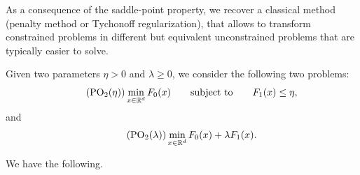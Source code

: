 \documentclass{report}
\begin{document}
As a consequence of the saddle-point property, we recover a classical method (penalty method or Tychonoff regularization), that allows to transform constrained problems in different but equivalent unconstrained problems that are typically easier to solve.

Given two parameters $\eta> 0$ and $\lambda \ge 0$, we consider the following two problems:
	\begin{equation}
		\label{eq:op-eta}
		\tag{PO$_2$($\eta$)}
		\min_{x\in\mathbb{R}^d}F_0(x) 
		\qquad\text{subject to}\qquad 
		F_1(x)\le \eta,
	\end{equation}
	and
	\begin{equation}
		\label{eq:op-lambda}
		\tag{PO$_2$($\lambda$)}
		\min_{x\in\mathbb{R}^d}F_0(x) + \lambda F_1(x).
	\end{equation}

	We have the following.

\end{document}
